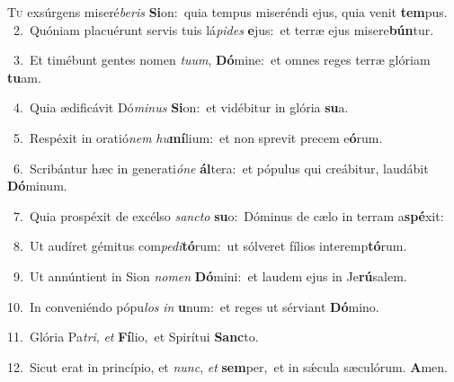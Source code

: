 \lettrine{\initial\textcolor{\initialcolor}{T}}{u} exsúrgens miseré\-\textit{be}\-\textit{ris} \textbf{Si}\-on:~\star quia tempus miseréndi ejus, quia venit \textbf{tem}\-pus.\\
{\numbfont\textcolor{\numbcolor}{~2.}}~Quóniam placuérunt servis tuis lá\-\textit{pi}\-\textit{des} \textbf{e}\-jus:~\star et terræ ejus misere\-\textbf{bún}\-tur.\par
{\numbfont\textcolor{\numbcolor}{~3.}}~Et timébunt gentes nomen \textit{tu}\-\textit{um}, \textbf{Dó}\-mine:~\star et omnes reges terræ glóriam \textbf{tu}\-am.\par
{\numbfont\textcolor{\numbcolor}{~4.}}~Quia ædificávit Dó\-\textit{mi}\-\textit{nus} \textbf{Si}\-on:~\star et vidébitur in glória \textbf{su}\-a.\par
{\numbfont\textcolor{\numbcolor}{~5.}}~Respéxit in oratió\textit{nem} \textit{hu}\-\textbf{mí}lium:~\star et non sprevit precem e\-\textbf{ó}\-rum.\par
{\numbfont\textcolor{\numbcolor}{~6.}}~Scribántur hæc in generati\-\textit{ó}\-\textit{ne} \textbf{ál}\-tera:~\star et pópulus qui creábitur, laudábit \textbf{Dó}\-minum.\par
{\numbfont\textcolor{\numbcolor}{~7.}}~Quia prospéxit de excélso \textit{sanc}\-\textit{to} \textbf{su}\-o:~\star Dóminus de cælo in terram a\-\textbf{spé}\-xit:\par
{\numbfont\textcolor{\numbcolor}{~8.}}~Ut audíret gémitus com\-\textit{pe}\-\textit{di}\textbf{tó}rum:~\star ut sólveret fílios interemp\-\textbf{tó}\-rum.\par
{\numbfont\textcolor{\numbcolor}{~9.}}~Ut annúntient in Sion \textit{no}\-\textit{men} \textbf{Dó}\-mini:~\star et laudem ejus in Je\-\textbf{rú}\-salem.\par
{\numbfont\textcolor{\numbcolor}{10.}}~In conveniéndo pópu\textit{los} \textit{in} \textbf{u}\-num:~\star et reges ut sérviant \textbf{Dó}\-mino.\par
{\numbfont\textcolor{\numbcolor}{11.}}~Glória Pa\-\textit{tri}\-, \textit{et} \textbf{Fí}\-lio,~\star et Spirítui \textbf{Sanc}\-to.\par
{\numbfont\textcolor{\numbcolor}{12.}}~Sicut erat in princípio, et \textit{nunc}\-, \textit{et} \textbf{sem}\-per,~\star et in sǽcula sæculórum. \textbf{A}\-men.\par
